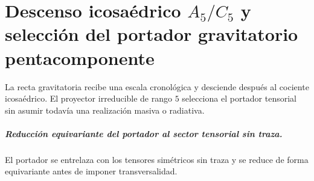 \chapter{Descenso icosaédrico \texorpdfstring{\(A_5/C_5\)}{A₅/C₅} y selección del portador gravitatorio pentacomponente}
\label{chap:parte-iv-63}

La recta gravitatoria recibe una escala cronológica y desciende después al cociente icosaédrico. El proyector irreducible de rango \(5\) selecciona el portador tensorial sin asumir todavía una realización masiva o radiativa.



\paragraph{Reducción equivariante del portador al sector tensorial sin traza.} El portador se entrelaza con los tensores simétricos sin traza y se reduce de forma equivariante antes de imponer transversalidad.
